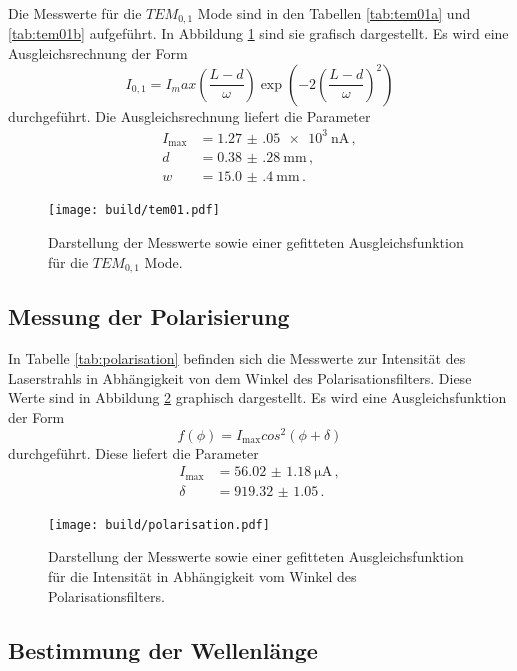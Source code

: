 Die Messwerte für die $TEM_{0,1}$ Mode sind in den Tabellen \ref{tab:tem01a} und \ref{tab:tem01b} aufgeführt. In Abbildung \ref{fig:tem01} sind sie grafisch dargestellt. Es wird eine Ausgleichsrechnung
der Form
\begin{equation*}
  I_{0,1}=I_max\left(\frac{L-d}{\omega}\right) \exp\left(-2\left(\frac{L-d}{\omega}\right)^2\right)
\end{equation*}
durchgeführt.
Die Ausgleichsrechnung liefert die Parameter
\begin{align*}
  I_{\text{max}}&=\SI{1.27(05)e3}{\nano\ampere} \,,\\
  d&=\SI{0.38(28)}{\milli\metre} \,,\\
  w&=\SI{15.0(4)}{\milli\metre} \,.
\end{align*}

\begin{figure}
  \centering
  \texttt{[image: build/tem01.pdf]}
  \caption{Darstellung der Messwerte sowie einer gefitteten Ausgleichsfunktion für die $TEM_{0,1}$ Mode.}
  \label{fig:tem01}
\end{figure}

\subsection{Messung der Polarisierung}
\label{subsec:polarisierung}

In Tabelle \ref{tab:polarisation} befinden sich die Messwerte zur Intensität des
Laserstrahls in Abhängigkeit von dem Winkel des Polarisationsfilters. Diese Werte
sind in Abbildung \ref{fig:polarisation} graphisch dargestellt. Es wird eine Ausgleichsfunktion der Form
\begin{equation*}
  f(\phi)=I_{\text{max}} cos^2(\phi+\delta)
\end{equation*}
durchgeführt. Diese liefert die Parameter
\begin{align*}
  I_{\text{max}}&=\SI{56.02(118)}{\micro\ampere} \,, \\
  \delta&=\SI{919.32(105)} \,.
\end{align*}

\begin{figure}
  \centering
  \texttt{[image: build/polarisation.pdf]}
  \caption{Darstellung der Messwerte sowie einer gefitteten Ausgleichsfunktion für die Intensität in
  Abhängigkeit vom Winkel des Polarisationsfilters.}
  \label{fig:polarisation}
\end{figure}


\subsection{Bestimmung der Wellenlänge}
\label{subsec:wellenlaenge}
